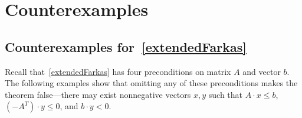 \documentclass[]{article}
\renewcommand{\.}{\hskip .75pt}
\let\*=\cdot
\begin{document}
\section{Counterexamples}
\label{counterexamples}

\subsection{Counterexamples for~\ref{extendedFarkas}}
\label{sec:extendedFarkas:counterexamples}

Recall that~\ref{extendedFarkas} has four preconditions on matrix $A$ and vector $b$.
The following examples show that omitting any of these preconditions makes the theorem
false\:---\:there may exist nonnegative vectors $x,y$ such that 
$A \* x \le b$, $(-A^T) \* y \le 0$, and $b \* y < 0$.
\vspace{-9pt}
 
\end{document}
